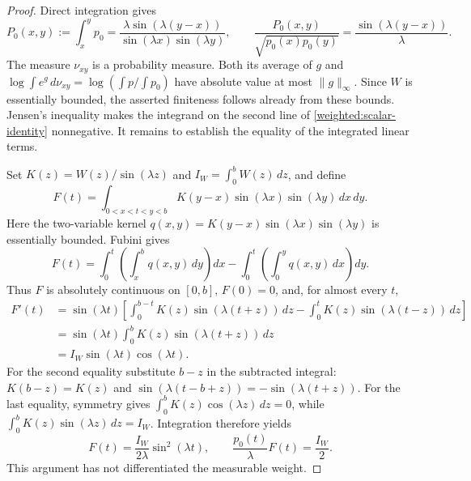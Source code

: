 \begin{proof}
Direct integration gives
\begin{equation}
 P_0(x,y):=\int_x^y p_0
 =\frac{\lambda\sin(\lambda(y-x))}
        {\sin(\lambda x)\sin(\lambda y)},\qquad
 \frac{P_0(x,y)}{\sqrt{p_0(x)p_0(y)}}
 =\frac{\sin(\lambda(y-x))}{\lambda}.
 \label{weighted:chord}
\end{equation}
The measure $\nu_{xy}$ is a probability measure.  Both its average of
$g$ and $\log\int e^g\,d\nu_{xy}=\log(\int p/\int p_0)$ have absolute
value at most $\|g\|_\infty$.  Since $W$ is essentially bounded, the asserted
finiteness follows already from these bounds.  Jensen's inequality makes
the integrand on the second line of
\eqref{weighted:scalar-identity} nonnegative.  It remains to establish
the equality of the integrated linear terms.

Set $K(z)=W(z)/\sin(\lambda z)$ and $I_W=\int_0^b W(z)\,dz$, and define
\[
 F(t)=\int_{0<x<t<y<b}
 K(y-x)\sin(\lambda x)\sin(\lambda y)\,dx\,dy.
\]
Here the two-variable kernel
$q(x,y)=K(y-x)\sin(\lambda x)\sin(\lambda y)$ is essentially bounded.
Fubini gives
\[
 F(t)=\int_0^t\left(\int_x^b q(x,y)\,dy\right)dx
       -\int_0^t\left(\int_0^y q(x,y)\,dx\right)dy.
\]
Thus $F$ is absolutely continuous on $[0,b]$, $F(0)=0$, and, for almost
every $t$,
\begin{align*}
 F'(t)
 &=\sin(\lambda t)\left[
   \int_0^{b-t}K(z)\sin(\lambda(t+z))\,dz
   -\int_0^t K(z)\sin(\lambda(t-z))\,dz\right]\\
 &=\sin(\lambda t)\int_0^b K(z)\sin(\lambda(t+z))\,dz\\
 &=I_W\sin(\lambda t)\cos(\lambda t).
\end{align*}
For the second equality substitute $b-z$ in the subtracted integral:
$K(b-z)=K(z)$ and
$\sin(\lambda(t-b+z))=-\sin(\lambda(t+z))$.
For the last equality, symmetry gives
$\int_0^b K(z)\cos(\lambda z)\,dz=0$, while
$\int_0^b K(z)\sin(\lambda z)\,dz=I_W$.
Integration therefore yields
\begin{equation}
 F(t)=\frac{I_W}{2\lambda}\sin^2(\lambda t),\qquad
 \frac{p_0(t)}{\lambda}F(t)=\frac{I_W}{2}.
 \label{weighted:coefficient}
\end{equation}
This argument has not differentiated the measurable weight.


\end{proof}
